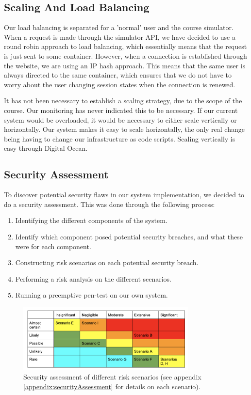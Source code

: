 \subsection{Scaling And Load Balancing}
Our load balancing is separated for a 'normal' user and the course simulator. When a request is made through the simulator API, we have decided to use a round robin approach to load balancing, which essentially means that the request is just sent to some container. However, when a connection is established through the website, we are using an IP hash approach. This means that the same user is always directed to the same container, which ensures that we do not have to worry about the user changing session states when the connection is renewed.

It has not been necessary to establish a scaling strategy, due to the scope of the course. Our monitoring has never indicated this to be necessary. If our current system would be overloaded, it would be necessary to either scale vertically or horizontally. Our system makes it easy to scale horizontally, the only real change being having to change our infrastructure as code scripts. Scaling vertically is easy through Digital Ocean.

\subsection{Security Assessment}
To discover potential security flaws in our system implementation, we decided to do a security assessment. This was done through the following process: 
\begin{enumerate}
    \item Identifying the different components of the system.
    \item Identify which component posed potential security breaches, and what these were for each component.
    \item Constructing risk scenarios on each potential security breach.
    \item Performing a risk analysis on the different scenarios.
    \item Running a preemptive pen-test on our own system.
\end{enumerate}

\begin{figure}[H]
    \centering
    \includegraphics[width=0.8\textwidth]{images/securityAssessment.png}
    \caption{Security assessment of different risk scenarios (see appendix \ref{appendix:securityAssessment} for details on each scenario).}
    \label{fig:securityAssessmentTable}
\end{figure}


